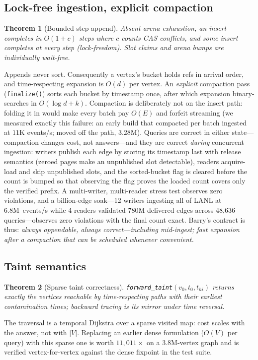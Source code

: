 \documentclass[11pt,letterpaper,twocolumn]{article}
\newtheorem{theorem}{Theorem}
\begin{document}
\subsection{Lock-free ingestion, explicit compaction}
\begin{theorem}[Bounded-step append]
\label{thm:append}
Absent arena exhaustion, an insert completes in $O(1+c)$ steps where
$c$ counts CAS conflicts, and some insert completes at every step
(lock-freedom). Slot claims and arena bumps are individually
wait-free.
\end{theorem}
Appends never sort. Consequently a vertex's bucket holds refs in
arrival order, and time-respecting expansion is $O(d)$ per vertex. An
\emph{explicit} compaction pass (\texttt{finalize()}) sorts each
bucket by timestamp once, after which expansion binary-searches in
$O(\log d + k)$. Compaction is deliberately not on the insert path:
folding it in would make every batch pay $O(E)$ and forfeit streaming
(we measured exactly this failure: an early build that compacted per
batch ingested at $11$K events/s; moved off the path, $3.28$M).
Queries are correct in either state---compaction changes cost, not
answers---and they are correct \emph{during} concurrent ingestion:
writers publish each edge by storing its timestamp last with release
semantics (zeroed pages make an unpublished slot detectable), readers
acquire-load and skip unpublished slots, and the sorted-bucket flag is
cleared before the count is bumped so that observing the flag proves
the loaded count covers only the verified prefix. A multi-writer,
multi-reader stress test observes zero violations, and a
billion-edge soak---12 writers ingesting all of LANL at
6.8M~events/s while 4 readers validated 780M delivered edges across
48{,}636 queries---observes zero violations with the final count
exact. Barry's contract is thus: \emph{always
appendable, always correct---including mid-ingest; fast expansion
after a compaction that can be scheduled whenever convenient.}

\subsection{Taint semantics}
\begin{theorem}[Sparse taint correctness]
\label{thm:taint}
\texttt{forward\_taint}$(v_0,t_0,t_{hi})$ returns exactly the
vertices reachable by time-respecting paths with their earliest
contamination times; backward tracing is its mirror under time
reversal.
\end{theorem}
The traversal is a temporal Dijkstra over a sparse visited map: cost
scales with the answer, not with $|V|$. Replacing an earlier dense
formulation ($O(V)$ per query) with this sparse one is worth
$11{,}011\times$ on a 3.8M-vertex graph and is verified
vertex-for-vertex against the dense fixpoint in the test suite.
\end{document}

